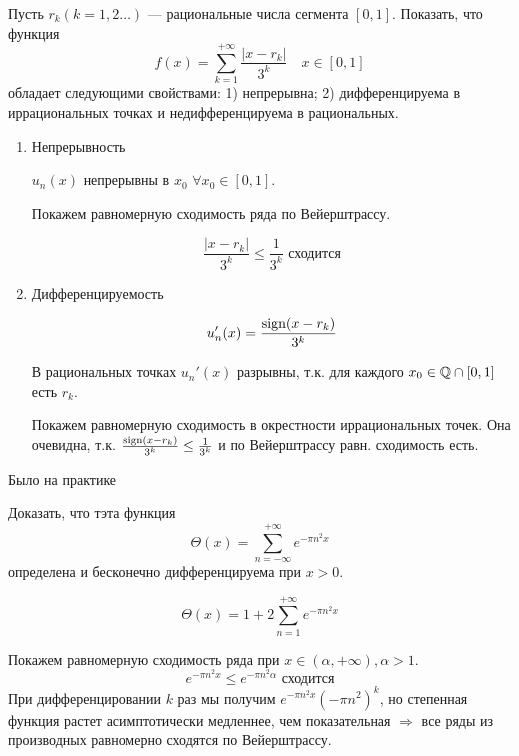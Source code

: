 \begin{exercise}[2796]
    Пусть \(r_k (k = 1,2 \dots )\) --- рациональные числа сегмента \([0,1]\). Показать, что функция
    \[f(x) = \sum_{k = 1}^{+\infty} \frac{|x - r_k|}{3^k} \quad x\in[0, 1]\]
    обладает следующими свойствами: 1) непрерывна; 2) дифференцируема в иррациональных точках и недифференцируема в рациональных.

    \begin{enumerate}
        \item Непрерывность

              \(u_n(x)\) непрерывны в \(x_0\) \(\forall x_0\in[0, 1]\).

              Покажем равномерную сходимость ряда по Вейерштрассу.

              \[\frac{|x - r_k|}{3^k} \leq \frac{1}{3^k} \text{ сходится}\]

        \item Дифференцируемость

              \[u_n'(x) = \frac{\operatorname{\text{sign}} (x - r_k)}{3^k}\]

              В рациональных точках \(u_n'(x)\) разрывны, т.к. для каждого \(x_0 \in \mathbb{Q}\cap[0, 1]\) есть \(r_k\).

              Покажем равномерную сходимость в окрестности иррациональных точек. Она очевидна, т.к. \(\frac{\operatorname{\text{sign}} (x - r_k)}{3^k} \leq \frac{1}{3^k} \) и по Вейерштрассу равн. сходимость есть.
    \end{enumerate}
\end{exercise}

\begin{exercise}[2797]
    Было на практике
\end{exercise}

\begin{exercise}[2798]
    Доказать, что тэта функция
    \[\Theta(x) = \sum_{n = -\infty}^{+\infty} e^{ -\pi n^2 x}\]
    определена и бесконечно дифференцируема при \(x > 0\).

    \[\Theta(x) = 1 + 2\sum_{n = 1}^{ +\infty} e^{ -\pi n^2 x}\]

    Покажем равномерную сходимость ряда при \(x \in (\alpha, +\infty), \alpha > 1\).
    \[e^{ -\pi n^2 x} \leq e^{ -\pi n^2 \alpha} \text{ сходится}\]
    При дифференцировании \(k\) раз мы получим \(e^{ -\pi n^2 x} ( -\pi n^2)^k\), но степенная функция растет асимптотически медленнее, чем показательная \( \Rightarrow \) все ряды из производных равномерно сходятся по Вейерштрассу.
\end{exercise}

